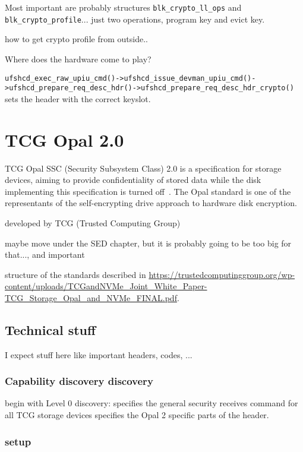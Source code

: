 \documentclass[
  digital, %
  oneside, %
  nolof,     %
  nolot,     %
]{fithesis4}
\begin{document}
Most important are probably structures \verb|blk_crypto_ll_ops| and \verb|blk_crypto_profile|... just two operations, program key and evict key. 



how to get crypto profile from outside..




Where does the hardware come to play?

\verb|ufshcd_exec_raw_upiu_cmd()->ufshcd_issue_devman_upiu_cmd()->ufshcd_prepare_req_desc_hdr()->ufshcd_prepare_req_desc_hdr_crypto()| sets the header with the correct keyslot.

\chapter{TCG Opal 2.0}

TCG Opal SSC (Security Subsystem Class) 2.0 is a specification for storage devices, aiming to provide confidentiality of stored data while the disk implementing this specification is turned off~\cite{tcg-opal2}. The Opal standard is one of the representants of the self-encrypting drive approach to hardware disk encryption.


developed by TCG (Trusted Computing Group)

maybe move under the SED chapter, but it is probably going to be too big for that..., and important


structure of the standards described in \url{https://trustedcomputinggroup.org/wp-content/uploads/TCGandNVMe_Joint_White_Paper-TCG_Storage_Opal_and_NVMe_FINAL.pdf}.



\section{Technical stuff}

I expect stuff here like important headers, codes, ...

\subsection{Capability discovery discovery}


begin with Level 0 discovery: \parencite[3.3.6]{tcg-storage-core} specifies the general security receives command for all TCG storage devices \cite[3.1.1]{tcg-opal2} specifies the Opal 2 specific parts of the header.

\subsection{setup}
\end{document}
